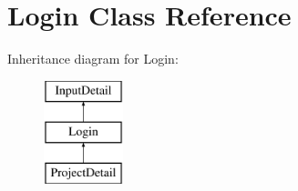 \hypertarget{classLogin}{\section{Login Class Reference}
\label{classLogin}
}
Inheritance diagram for Login\-:\begin{figure}[H]
\begin{center}
\leavevmode
\includegraphics[height=3.000000cm]{classLogin}
\end{center}
\end{figure}

